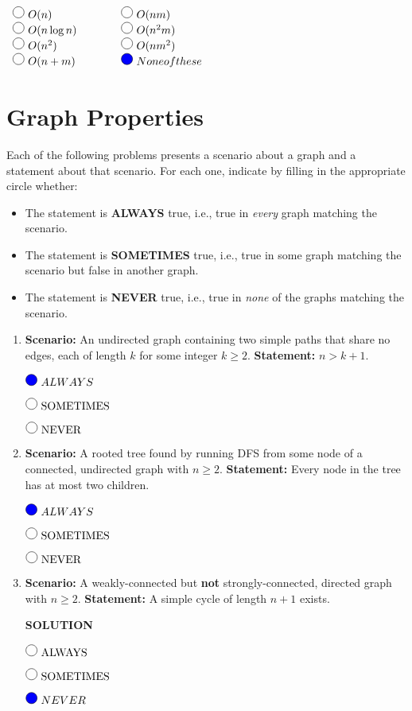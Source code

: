 \documentclass[11pt]{article}
\newcommand{\fillinMC}[1]{\fillinMCmath{\mbox{#1}}}
\newcommand{\fillinMCmath}[1]{\begin{tikzpicture}\draw circle [radius=0.5em];\end{tikzpicture}\ #1}
\newcommand{\fillinMCmathsoln}[1]{\begin{tikzpicture}\draw[black, fill=blue] circle [radius=0.5em];\end{tikzpicture}\ #1}
\begin{document}
\begin{enumerate}
$\begin{array}{lcl}
\fillinMCmath{O(n)} & \qquad & \fillinMCmath{O(nm)} \\
\fillinMCmath{O(n\log n)} & \qquad & \fillinMCmath{O(n^2m)}\\
\fillinMCmath{O(n^2)} & \qquad & \fillinMCmath{O(nm^2)}\\
\fillinMCmath{O(n+m)} & \qquad & \fillinMCmathsoln{None of these}
\end{array}$
\end{enumerate}

\section{Graph Properties}
\label{sec-2}
Each of the following problems presents a scenario about a graph and a
statement about that scenario. For each one, indicate by filling in
the appropriate circle whether:
\begin{itemize}
\item The statement is \textbf{ALWAYS} true, i.e., true in \emph{every} graph
matching the scenario.
\item The statement is \textbf{SOMETIMES} true, i.e., true in some graph
matching the scenario but false in another graph.
\item The statement is \textbf{NEVER} true, i.e., true in \emph{none} of the graphs
matching the scenario.
\end{itemize}


\begin{enumerate}
\item \textbf{Scenario:} An undirected graph containing two simple paths that
share no edges, each of length $k$ for some integer $k \geq
   2$. \textbf{Statement:} $n > k+1$.

$\fillinMCmathsoln{ALWAYS}$

$\fillinMC{SOMETIMES}$

$\fillinMC{NEVER}$

\item \textbf{Scenario:} A rooted tree found by running DFS from some
node of a connected,
undirected graph with $n \geq 2$. \textbf{Statement:} Every
node in the tree has at most two children.

$\fillinMCmathsoln{ALWAYS}$

$\fillinMC{SOMETIMES}$

$\fillinMC{NEVER}$

\item \textbf{Scenario:} A weakly-connected but \textbf{not} strongly-connected,
directed graph with $n \geq 2$. \textbf{Statement:} A simple cycle of
length $n+1$ exists.

\textbf{SOLUTION}

$\fillinMC{ALWAYS}$

$\fillinMC{SOMETIMES}$

$\fillinMCmathsoln{NEVER}$
\end{enumerate}
\end{document}
